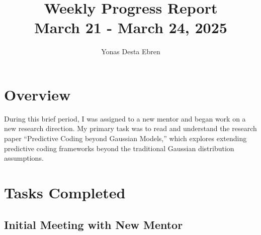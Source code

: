 \documentclass{article}
\title{\textbf{Weekly Progress Report}\\[0.5em]\Large{March 21 - March 24, 2025}}
\author{Yonas Desta Ebren}
\date{}
\begin{document}
\maketitle

\section{Overview}
During this brief period, I was assigned to a new mentor and began work on a new research direction. My primary task was to read and understand the research paper ``Predictive Coding beyond Gaussian Models,'' which explores extending predictive coding frameworks beyond the traditional Gaussian distribution assumptions.

\section{Tasks Completed}

\subsection{Initial Meeting with New Mentor}
\end{document}
